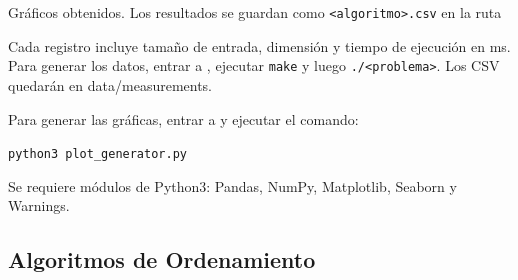 








Gráficos obtenidos. Los resultados se guardan como \texttt{<algoritmo>.csv} en la ruta


Cada registro incluye tamaño de entrada, dimensión y tiempo de ejecución en ms. Para generar los datos, entrar a , ejecutar \texttt{make} y luego \texttt{./<problema>}.
Los CSV quedarán en data/measurements.

Para generar las gráficas, entrar a  y ejecutar el comando:

\texttt{python3 plot\_generator.py}

Se requiere módulos de Python3: Pandas, NumPy, Matplotlib, Seaborn y Warnings.

\subsection*{Algoritmos de Ordenamiento}

